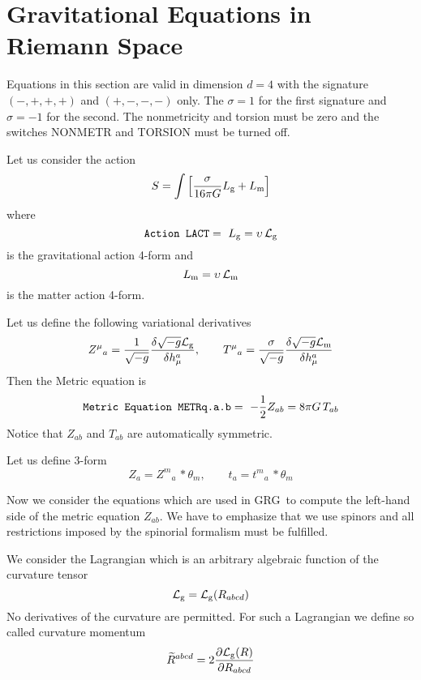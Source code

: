 \documentclass[twoside,openright]{report}
\newcommand{\grgtt}{\ttfamily}
\newcommand{\object}[2]{%
\begin{equation}
\mbox{\comm{#1}} =\ #2
\end{equation}}
\newcommand{\seethis}[1]{\marginpar{\footnotesize\it #1}}
\renewcommand{\tt}{\grgtt}
\newcommand{\grg}{{\sc GRG}}
\newcommand{\comm}[1]{{\upshape\tt#1}}    %
\begin{document}
\section{Gravitational Equations in Riemann Space}

Equations in this section are valid in dimension $d=4$
with the signature ${\scriptstyle(-,+,+,+)}$ and
${\scriptstyle(+,-,-,-)}$ only.
The $\sigma=1$ for the first signature and $\sigma=-1$
for the second. The nonmetricity and torsion must be zero and the
switches \comm{NONMETR} and \comm{TORSION} must be turned off.

Let us consider the action
\begin{equation}
S=\int\left[\frac{\sigma}{16\pi G}L_{\rm g}
+L_{\rm m}\right]
\end{equation}
where
\object{Action LACT}{L_{\rm g}=\upsilon\,{\cal L}_{\rm g}}
is the gravitational action 4-form and
\begin{equation}
L_{\rm m} = \upsilon\,{\cal L}_{\rm m}
\end{equation}
is the matter action 4-form.

Let us define the following variational derivatives
\begin{equation}
Z^\mu{}_{a} = \frac{1}{\sqrt{-g}}
\frac{\delta\sqrt{-g}{\cal L}_{\rm g}}{\delta h^a_\mu}
,\qquad
T^\mu{}_{a} = \frac{\sigma}{\sqrt{-g}}
\frac{\delta\sqrt{-g}{\cal L}_{\rm m}}{\delta h^a_\mu}
\end{equation}
Then the {\tt Metric equation} is \label{metreq}
\object{Metric Equation METRq.a.b}{-\frac12Z_{ab}=8\pi G\,T_{ab}}
Notice that $Z_{ab}$ and $T_{ab}$ are automatically symmetric.

Let us define 3-form
\begin{equation}
Z_a = Z^m{}_a\,*\theta_m,\qquad t_a = t^m{}_a\,*\theta_m
\end{equation}

Now we consider the equations which are used in \grg\ to
compute the left-hand side of the metric equation
$Z_{ab}$. We have to emphasize that we use
spinors and all restrictions imposed by the spinorial formalism
\seethis{See pages \pageref{spinors}\ or \pageref{spinors1}.}
must be fulfilled.

We consider the Lagrangian which is an arbitrary algebraic function
of the curvature tensor
\begin{equation}
{\cal L}_{\rm g} = {\cal L}_{\rm g}(R_{abcd})
\end{equation}
No derivatives of the curvature are permitted.
For such a Lagrangian we define so called curvature momentum
\begin{equation}
\widetilde{R}{}^{abcd} =
2\frac{\partial{\cal L}_{\rm g}(R)}{\partial R_{abcd}}
\end{equation}
\end{document}
